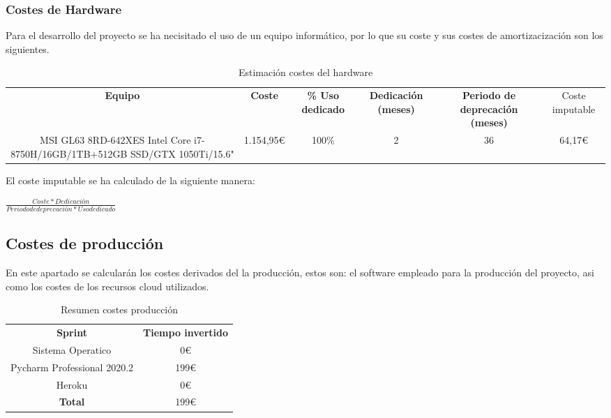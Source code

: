 \subsubsection{Costes de Hardware}

Para el desarrollo del proyecto se ha necisitado el uso de un equipo informático, por lo que su coste y sus costes de amortizacización son los siguientes.

\begin{table}[H]
	\begin{center}
		\begin{adjustbox}{max width=\textwidth}
			\begin{tabular}{| c | c | c | c | c | c |}
				\hline
				
				\textbf{Equipo} & \textbf{Coste} & \textbf{\% Uso dedicado} & \textbf{Dedicación (meses)} & \textbf{Periodo de deprecación (meses)} & Coste imputable \\
				MSI GL63 8RD-642XES Intel Core i7-8750H/16GB/1TB+512GB SSD/GTX
				1050Ti/15.6" & 1.154,95€ & 100\% & 2 & 36 & 64,17€ \\ \hline
			\end{tabular}
		\end{adjustbox}
		\caption{Estimación costes del hardware}
	\end{center}
\end{table}

El coste imputable se ha calculado de la siguiente manera:

\begin{center}
	$ \frac{Coste * Dedicación}{Periodo de deprecación * Uso dedicado} $ 
\end{center} 


\subsection{Costes de producción}

En este apartado se calcularán los costes derivados del la producción, estos son: el software empleado para la producción del proyecto, asi como los costes de los recursos cloud utilizados.

\begin{table}[H]
	\begin{center}
		\begin{tabular}{| c | c |}
			\hline
			
			\textbf{Sprint} & \textbf{Tiempo invertido} \\
			Sistema Operatico & 0€ \\
			Pycharm Professional 2020.2 & 199€ \\
			Heroku & 0€ \\
			\textbf{Total} & 199€ \\ \hline
		\end{tabular}
		\caption{Resumen costes producción}
	\end{center}
\end{table}

